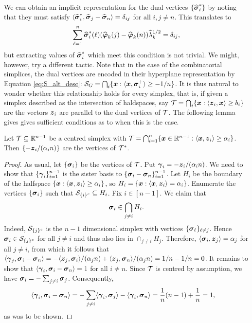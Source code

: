 
We can obtain an implicit representation for the dual vertices $\{\widehat{\vb*{\sigma}}^*_i\}$ by noting that they must satisfy  $\langle \widehat{\vb*{\sigma}}^*_i,\widehat{\vb*{\sigma}}_j-\widehat{\vb*{\sigma}}_n\rangle=\delta_{ij}$ for all $i,j\neq n$. This translates to 
\begin{equation*}
\sum_{\ell=1}^n \widehat{\vb*{\sigma}}^*_i(\ell)(\widehat{\vb*{\varphi}}_k(j)-\widehat{\vb*{\varphi}}_k(n))\widehat{\lambda}_k^{1/2}=\delta_{ij},
\end{equation*}
but extracting values of $\widehat{\vb*{\sigma}}^*_i$ which meet this condition is not trivial. 
We might, however, try a different tactic. Note that in the case of the combinatorial simplices, the dual vertices are encoded in their hyperplane representation by Equation \eqref{eq:S_alt_desc}: $\mathcal{S}_G = \bigcap_i\{\vb*{x}:\langle \vb*{x},\vb*{\sigma}_i^+\rangle \geq -1/n\}$. It is thus  natural to wonder whether this relationship holds for every simplex, that is,  if given a simplex described as the intersection of haldspaces, say $\mathcal{T}=\bigcap_i \{\vb*{x}:\langle \vb*{z}_i,\vb*{x}\rangle \geq b_i\}$ are the vectors $\vb*{z}_i$ are parallel to the dual vertices of $\mathcal{T}$.  The following lemma gives gives sufficient conditions as to when this is the case. 

 
\begin{lemma}
	\label{lem:hdesc_dual}
	Let $\mathcal{T}\subseteq\mathbb{R}^{n-1}$ be a centred simplex with $\mathcal{T}=\bigcap_{i=1}^n  \{\vb*{x}\in\mathbb{R}^{n-1}: \langle \vb*{x},\vb*{z}_i\rangle \geq  \alpha_i\}$. Then $\{-\vb*{z}_i/(\alpha_i n)\}$ are the vertices of $\mathcal{T}^*$. 
\end{lemma}
\begin{proof}
	As usual, let $\{\vb*{\sigma}_i\}$ be the vertices of $\mathcal{T}$. Put $\vb*{\gamma}_i = -\vb*{z}_i/(\alpha_i n)$. We need to show that $\{\vb*{\gamma}_i\}_{i=1}^{n-1}$ is the sister basis to $\{\vb*{\sigma}_i-\vb*{\sigma}_n\}_{i=1}^{n-1}$. Let $H_i$ be the boundary of the halfspace $\{\vb*{x}:\langle \vb*{x},\vb*{z}_i\rangle \geq \alpha_i\}$, so $H_i = \{\vb*{x}:\langle \vb*{x},\vb*{z}_i\rangle = \alpha_i\}$. Enumerate the vertices $\{\vb*{\sigma}_i\}$ such that $\mathcal{S}_{\{i\}^c} \subseteq H_i$. Fix $i\in[n-1]$. We claim that 
	\[\vb*{\sigma}_i \in \bigcap_{j\neq i}H_i.\]
	Indeed, $\mathcal{S}_{\{j\}^c}$ is the $n-1$ dimensional simplex with vertices $\{\vb*{\sigma}_\ell\}_{\ell\neq j}$. Hence $\vb*{\sigma}_i\in \mathcal{S}_{\{j\}^c}$ for all $j\neq i$ and thus also lies in $\cap_{j \neq i}H_j$. Therefore, $\langle \vb*{\sigma}_i,\vb*{z}_j\rangle = \alpha_j$ for all $j\neq i$, from which it follows  that $\langle \vb*{\gamma}_j,\vb*{\sigma}_i-\vb*{\sigma}_n\rangle = -\langle \vb*{z}_j,\vb*{\sigma}_i\rangle/(\alpha_j n) + \langle \vb*{z}_j,\vb*{\sigma}_n\rangle / (\alpha_j n )=1/n - 1/n =0$.  
	It remains to show that $\langle \vb*{\gamma}_i,\vb*{\sigma}_i-\vb*{\sigma}_n\rangle=1$ for all $i\neq n$. Since $\mathcal{T}$ is centred by assumption, we have $\vb*{\sigma}_i = -\sum_{j\neq i} \vb*{\sigma}_j$. Consequently, 
	\begin{align*}
	\langle \vb*{\gamma}_i,\vb*{\sigma}_i-\vb*{\sigma}_n\rangle &= -\sum_{j\neq i}\langle \vb*{\gamma}_i,\vb*{\sigma}_j\rangle - \langle \vb*{\gamma}_i,\vb*{\sigma}_n \rangle = \frac{1}{n}(n-1) + \frac{1}{n} = 1,
	\end{align*}
	as was to be shown.  
\end{proof}

